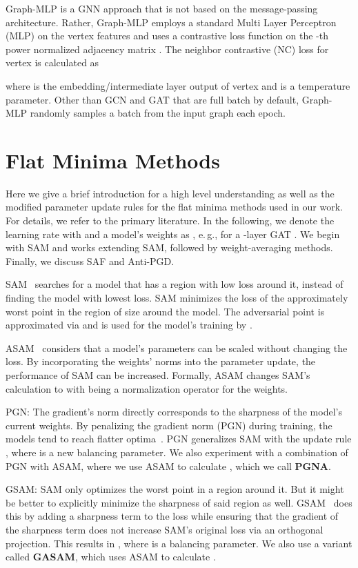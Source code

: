 \documentclass[runningheads]{llncs}
\newcommand{\eg}{e.\,g.,\xspace}
\newcommand{\GraphMLP}{Graph-MLP\xspace}
\begin{document}
\GraphMLP \cite{graphMLPwoMP} is a GNN approach that is not based on the message-passing architecture.
Rather, \GraphMLP employs a standard Multi Layer Perceptron (MLP) on the vertex features and uses a contrastive loss function on the -th power normalized adjacency matrix .
The neighbor contrastive (NC) loss for vertex  is calculated as

where  is the embedding/intermediate layer output of vertex  and  is a temperature parameter.
Other than GCN and GAT that are full batch by default, \GraphMLP randomly samples a batch from the input graph each epoch.

\section{Flat Minima Methods}
\label{sec:methods}

Here we give a brief introduction for a high level understanding as well as the modified parameter update rules for the flat minima methods used in our work.
For details, we refer to the primary literature.
In the following, we denote the learning rate with  and a model's weights as , \eg for a -layer GAT .
We begin with SAM and works extending SAM, followed by weight-averaging methods.
Finally, we discuss SAF and Anti-PGD.

SAM~\cite{Foret21sharpness} searches for a model that has a region with low loss around it, instead of finding the model with lowest loss.
SAM minimizes the loss of the approximately worst point  in the region of size  around the model.
The adversarial point is approximated via  and is used for the model's training by .

ASAM~\cite{Kwon21asam} considers that a model's parameters can be scaled without changing the loss.
By incorporating the weights' norms into the parameter update, the performance of SAM can be increased.
Formally, ASAM changes SAM's calculation to 
 with  being a normalization operator for the weights.

PGN: The gradient's norm directly corresponds to the sharpness of the model's current weights.
By penalizing the gradient norm (PGN) during training, the models tend to reach flatter optima~\cite{zhao2022penalizing}.
PGN generalizes SAM with the update rule , where  is a new balancing parameter.
We also experiment with a combination of PGN with ASAM, where we use ASAM to calculate , which we call \textbf{PGNA}.

GSAM: SAM only optimizes the worst point in a region around it.
But it might be better to explicitly minimize the sharpness of said region as well.
GSAM~\cite{GSAM} does this by adding a sharpness term to the loss while ensuring that the gradient of the sharpness term does not increase SAM's original loss via an orthogonal projection.
This results in , where  is a balancing parameter.
We also use a variant called \textbf{GASAM}, which uses ASAM to calculate .
\end{document}
